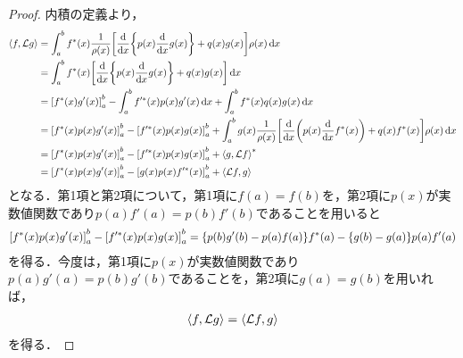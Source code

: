 \documentclass{report}
\begin{document}
      \begin{proof}
        内積の定義より，
        \begin{align}
          \left\langle f, \mathcal{L}g \right\rangle &= \int_{a}^{b} f^*(x)\frac{1}{\rho(x)}\qty[\dv{x}\qty{p(x)\dv{x}g(x)} + q(x)g(x)]\rho(x)\dd{x} \\ 
          &= \int_{a}^{b} f^*(x)\qty[\dv{x}\qty{p(x)\dv{x}g(x)} + q(x)g(x)]\dd{x} \\ 
          &= \qty[f^*(x)g'(x)]_{a}^{b} - \int_{a}^{b}f'^*(x)p(x)g'(x)\dd{x} + \int_{a}^{b}f^*(x)q(x)g(x)\dd{x} \\ 
          &= \qty[f^*(x)p(x)g'(x)]_{a}^{b} - \qty[f'^*(x)p(x)g(x)]_{a}^{b} + \int_{a}^{b}g(x)\frac{1}{\rho(x)}\qty[\dv{x}\qty(p(x)\dv{x}f^*(x)) + q(x)f^*(x)]\rho(x)\dd{x} \\ 
          &= \qty[f^*(x)p(x)g'(x)]_{a}^{b} - \qty[f'^*(x)p(x)g(x)]_{a}^{b} + \left\langle g, \mathcal{L}f \right\rangle^* \\ 
          &= \qty[f^*(x)p(x)g'(x)]_{a}^{b} - \qty[g(x)p(x)f'^*(x)]_{a}^{b} + \left\langle \mathcal{L}f, g \right\rangle 
        \end{align}
        となる．第1項と第2項について，第1項に$f(a) = f(b)$を，第2項に$p(x)$が実数値関数であり$p(a)f'(a) = p(b)f'(b)$であることを用いると
        \begin{align}
          \qty[f^*(x)p(x)g'(x)]_{a}^{b} - \qty[f'^*(x)p(x)g(x)]_{a}^{b} = \qty{p(b)g'(b) - p(a)f(a)}f^*(a) - \qty{g(b) - g(a)}p(a)f'(a)
        \end{align}
        を得る．今度は，第1項に$p(x)$が実数値関数であり$p(a)g'(a) = p(b)g'(b)$であることを，第2項に$g(a) = g(b)$を用いれば，
        \begin{align}
          \left\langle f, \mathcal{L}g \right\rangle = \left\langle \mathcal{L}f, g \right\rangle
        \end{align}
        を得る．
      \end{proof}
\end{document}
